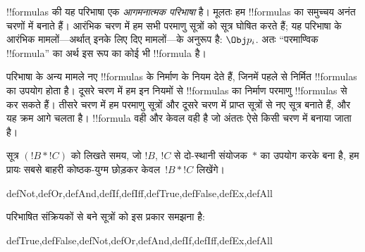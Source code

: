 \documentclass[../../../include/open-logic-section]{subfiles}
\begin{document}
\begin{explain}
!!{formula}s की यह परिभाषा एक \emph{आगमनात्मक परिभाषा} है। मूलतः हम
!!{formula}s का समुच्चय अनंत चरणों में बनाते हैं। आरंभिक चरण में हम सभी
परमाणु सूत्रों को सूत्र घोषित करते हैं; यह परिभाषा के आरंभिक मामलों—अर्थात्
इनके लिए दिए मामलों—के अनुरूप है:
%
%
$\Obj p_i$. अतः ``परमाण्विक !!{formula}'' का अर्थ इस रूप का कोई भी
!!{formula} है।

परिभाषा के अन्य मामले नए !!{formula}s के निर्माण के नियम देते हैं, जिनमें
पहले से निर्मित !!{formula}s का उपयोग होता है। दूसरे चरण में हम इन नियमों
से !!{formula}s का निर्माण परमाणु !!{formula}s से कर सकते हैं। तीसरे चरण में हम परमाणु
सूत्रों और दूसरे चरण में प्राप्त सूत्रों से नए सूत्र बनाते हैं, और यह क्रम
आगे चलता है। !!{formula} वही और केवल वही है जो अंततः ऐसे किसी चरण में
बनाया जाता है।
\end{explain}

सूत्र $(!B \ast !C)$ को लिखते समय, जो $!B$, $!C$ से दो-स्थानी
संयोजक~$\ast$ का उपयोग करके बना है, हम प्रायः सबसे बाहरी कोष्ठक-युग्म
छोड़कर केवल~$!B \ast !C$ लिखेंगे।

\begin{tagblock}{defNot,defOr,defAnd,defIf,defIff,defTrue,defFalse,defEx,defAll}
\begin{defn}
परिभाषित संक्रियकों से बने सूत्रों को इस प्रकार समझना है:

\begin{tagenumerate}{defTrue,defFalse,defNot,defOr,defAnd,defIf,defIff,defEx,defAll}







\end{tagenumerate}
\end{defn}
\end{tagblock}
\end{document}

